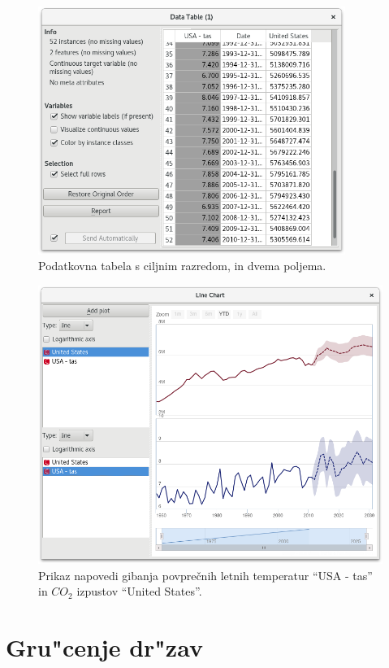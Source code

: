 \begin{figure}
\begin{center}
\includegraphics[width=10cm]{pic/var_data_table.png}
\end{center}
\caption{Podatkovna tabela s ciljnim razredom, in dvema poljema.}
\label{var_data_table}
\end{figure} 

\begin{figure}
\begin{center}
\includegraphics[width=12cm]{pic/var_forecast_graph.png}
\end{center}
\caption{Prikaz napovedi gibanja povprečnih letnih temperatur ``USA - tas'' in
  $CO_2$ izpustov ``United States''.}
\label{var_forecast_graph}
\end{figure} 




\section{Gru"cenje dr"zav}


